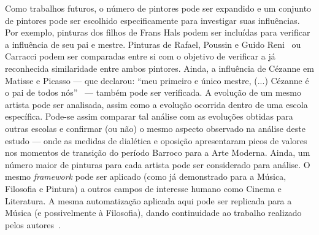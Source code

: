 Como trabalhos futuros, o número de pintores pode ser expandido e um
conjunto de pintores pode ser escolhido especificamente para
investigar suas influências. Por exemplo, pinturas dos filhos de Frans
Hals podem ser incluídas para verificar a influência de seu pai e
mestre. Pinturas de Rafael, Poussin e Guido Reni~\cite{gombrich} ou
Carracci podem ser comparadas entre si com o objetivo de verificar a
já reconhecida similaridade entre ambos pintores. Ainda, a influência
de Cézanne em Matisse e Picasso --- que declarou: ``meu primeiro e
único mestre, (...)  Cézanne é o pai de todos nós''~\cite{rishel} ---
também pode ser verificada. A evolução de um mesmo artista pode ser
analisada, assim como a evolução ocorrida dentro de uma escola
específica. Pode-se assim comparar tal análise com as evoluções
obtidas para outras escolas e confirmar (ou não) o mesmo aspecto
observado na análise deste estudo --- onde as medidas de dialética e
oposição apresentaram picos de valores nos momentos de transição do
período Barroco para a Arte Moderna. Ainda, um número maior de
pinturas para cada artista pode ser considerado para análise. O mesmo
\textit{framework} pode ser aplicado (como já demonstrado para a
Música, Filosofia e Pintura) a outros campos de interesse humano como
Cinema e Literatura. A mesma automatização aplicada aqui pode ser
replicada para a Música (e possivelmente à Filosofia), dando
continuidade ao trabalho realizado pelos autores~\cite{vieira}.


